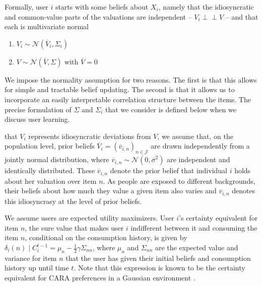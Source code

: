 \documentclass[manuscript]{acmart}
\begin{document}
Formally, user $i$ starts with some beliefs about $X_i$, namely that the idiosyncratic and common-value parts of the valuations are independent -- $V_i \perp \!\!\! \perp V$ -- and that each is multivariate normal 
\begin{enumerate}[topsep=0pt]
\item $V_i \sim \mathcal N (\overline V_i, \Sigma_i)$ 
\item $V \sim \mathcal N(\overline V, \Sigma)$ with $\overline V =0$
\end{enumerate}
We impose the normality assumption for two reasons. The first is that this allows for simple and tractable belief updating. The second is that it allows us to incorporate an easily interpretable correlation structure between the items. The precise formulation of $\Sigma$ and $\Sigma_i$ that we consider is defined below when we discuss user learning.
\par
{} that $V_i$ represents idiosyncratic deviations from $V$, we assume that, on the population level, prior beliefs $\overline V_i=\left(\overline v_{i,n}\right)_{n \in \mathcal{J}}$ are drawn independently from a jointly normal distribution, where $\overline v_{i,n} \sim \mathcal N (0, \overline \sigma^2)$ are independent and identically distributed. These $\overline v_{i,n}$ denote the prior belief that individual $i$ holds about her valuation over item $n$. As people are exposed to different backgrounds, their beliefs about how much they value a given item also varies and $\overline v_{i,n}$ denotes this idiosyncrasy at the level of prior beliefs.
\par

We assume users are expected utility maximizers. User $i$'s certainty equivalent for item $n$, the sure value that makes user $i$ indifferent between it and consuming the item $n$, conditional on the consumption history, is given by
$\delta_{i}(n)\mid C_i^{t-1}=\mu_n-\frac{1}{2}\gamma \Sigma_{nn}$, where $\mu_n$ and $\Sigma_{nn}$ are the expected value and variance for item $n$ that the user has given their initial beliefs and consumption history up until time $t$. Note that this expression is known to be the certainty equivalent for CARA preferences in a Gaussian environment \cite{mas1995microeconomic}.
\end{document}
